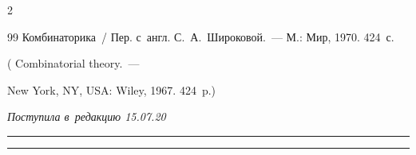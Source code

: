 \begin{multicols}{2}
{{\begin{thebibliography}{99}
 Комбинаторика~/ Пер. с~англ. С.\, А.~Широковой.~--- М.: Мир, 1970. 424~с.


( {Combinatorial theory.}~---


 New York, NY, USA: Wiley, 1967. 424~p.)





\end{thebibliography}





 }


 }





\end{multicols}





\vspace*{-6pt}





\hfill{\small\textit{Поступила в~редакцию 15.07.20}}





\vspace*{8pt}




















\hrule





\vspace*{2pt}





\hrule










\def\tit{IDENTIFYING ANOMALIES USING METADATA}





